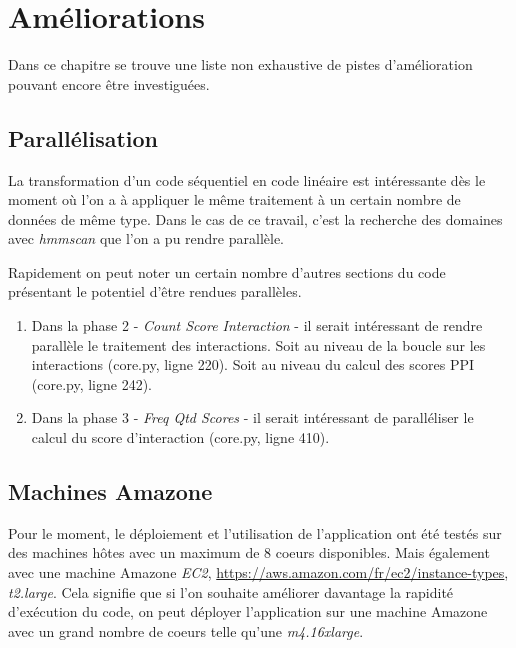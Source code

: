 \chapter{Améliorations}
\label{ch:improve}

Dans ce chapitre se trouve une liste non exhaustive de pistes d'amélioration pouvant encore être investiguées.

\section{Parallélisation}

La transformation d'un code séquentiel en code linéaire est intéressante dès le moment où l'on a à appliquer le même traitement à un certain nombre de données de même type. Dans le cas de ce travail, c'est la recherche des domaines avec \emph{hmmscan} que l'on a pu rendre parallèle.

Rapidement on peut noter un certain nombre d'autres sections du code présentant le potentiel d'être rendues parallèles.

\begin{enumerate} \item Dans la phase 2 - \emph{Count Score Interaction} - il serait intéressant de rendre parallèle le traitement des interactions. Soit au niveau de la boucle sur les interactions (core.py, ligne 220). Soit au niveau du calcul des scores PPI (core.py, ligne 242).
\item Dans la phase 3 - \emph{Freq Qtd Scores} - il serait intéressant de paralléliser le calcul du score d'interaction (core.py, ligne 410).
\end{enumerate}

\section{Machines Amazone}

Pour le moment, le déploiement et l'utilisation de l'application ont été testés sur des machines hôtes avec un maximum de 8 coeurs disponibles. Mais également avec une machine Amazone \emph{EC2}, \url{https://aws.amazon.com/fr/ec2/instance-types}, \emph{t2.large}. Cela signifie que si l'on souhaite améliorer davantage la rapidité d'exécution du code, on peut déployer l'application sur une machine Amazone avec un grand nombre de coeurs telle qu'une \emph{m4.16xlarge}.
